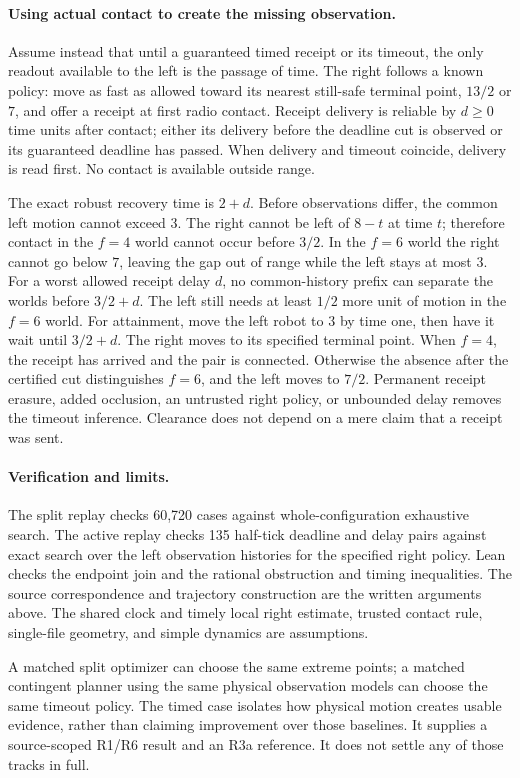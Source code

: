 \documentclass[11pt]{article}
\begin{document}
\paragraph{Using actual contact to create the missing observation.}
Assume instead that until a guaranteed timed receipt or its timeout,
the only readout available to the left is the passage of time.
The right follows a known policy: move as fast as allowed toward
its nearest still-safe terminal point, \(13/2\) or \(7\), and offer a
receipt at first radio contact. Receipt delivery is reliable by
\(d\ge0\) time units after contact; either its delivery before the
deadline cut is observed or its guaranteed deadline has passed.
When delivery and timeout coincide, delivery is read first. No contact
is available outside range.

The exact robust recovery time is \(2+d\).
Before observations differ, the common left motion cannot exceed \(3\).
The right cannot be left of \(8-t\) at time \(t\); therefore contact in
the \(f=4\) world cannot occur before \(3/2\). In the \(f=6\) world
the right cannot go below \(7\), leaving the gap out of range while
the left stays at most \(3\). For a worst allowed receipt delay
\(d\), no common-history prefix can separate the worlds before
\(3/2+d\). The left still needs at least \(1/2\) more unit of motion in
the \(f=6\) world. For attainment, move the left robot to \(3\) by time
one, then have it wait until \(3/2+d\). The right moves to its
specified terminal point. When \(f=4\), the receipt has arrived and
the pair is connected. Otherwise the absence after the certified cut
distinguishes \(f=6\), and the left moves to \(7/2\).
Permanent receipt erasure, added occlusion, an untrusted right policy,
or unbounded delay removes the timeout inference. Clearance
does not depend on a mere claim that a receipt was sent.

\paragraph{Verification and limits.}
The split replay checks 60,720 cases against whole-configuration
exhaustive search. The active replay checks 135 half-tick deadline and
delay pairs against exact search over the left observation histories
for the specified right policy. Lean checks the endpoint join and the
rational obstruction and timing inequalities. The source correspondence
and trajectory construction are the written arguments above. The
shared clock and timely local right estimate, trusted contact rule,
single-file geometry, and simple dynamics are assumptions.

A matched split optimizer can choose the same extreme points; a matched
contingent planner using the same physical observation models can
choose the same timeout policy. The timed case isolates how physical
motion creates usable evidence, rather than claiming improvement over
those baselines. It supplies a source-scoped R1/R6 result and an R3a
reference. It does not settle any of those tracks in full.
\end{document}
